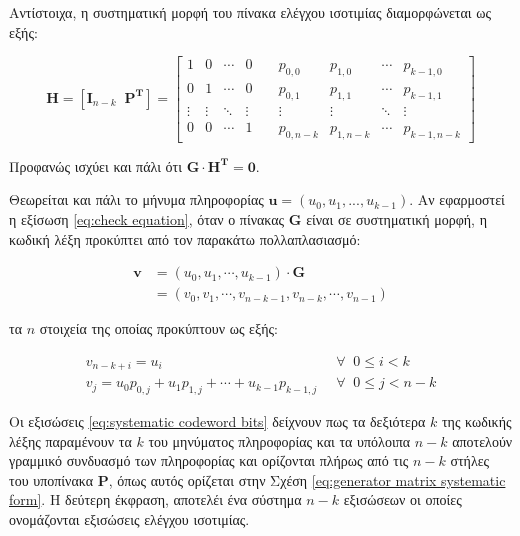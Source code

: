 Αντίστοιχα, η συστηματική μορφή του πίνακα ελέγχου ισοτιμίας διαμορφώνεται ως εξής:

\begin{equation}
\mathbf{H}=\left[\mathbf{I}_{n-k}\;\;\mathbf{P^T}\right]
=\begin{bmatrix}
1 & 0 & \cdots & 0 & \; & p_{0,0} & p_{1,0} & \cdots & p_{k-1,0} \\
0 & 1 & \cdots & 0 & \; & p_{0,1} & p_{1,1} & \cdots & p_{k-1,1} \\
\vdots & \vdots & \ddots & \vdots  & \; & \vdots & \vdots & \ddots & \vdots \\
0 & 0 & \cdots & 1 & \; & p_{0,n-k} & p_{1,n-k} & \cdots & p_{k-1,n-k}
\end{bmatrix}
\label{eq:parity check matrix systematic form}
\end{equation}

\vspace{5mm}
Προφανώς ισχύει και πάλι ότι $\mathbf{G}\cdot\mathbf{H^T}=\mathbf{0}$.

Θεωρείται και πάλι το μήνυμα πληροφορίας $\mathbf{u} = (u_0, u_1, ..., u_{k-1})$. Αν εφαρμοστεί η εξίσωση \ref{eq:check equation}, όταν ο πίνακας $\mathbf{G}$ είναι σε συστηματική μορφή, η κωδική λέξη προκύπτει από τον παρακάτω πολλαπλασιασμό:

\begin{equation}
\begin{split}
\mathbf{v} & = \left( u_0, u_1, \cdots, u_{k-1} \right) \cdot \mathbf{G}\\
& = \left( v_0, v_1, \cdots, v_{n-k-1}, v_{n-k}, \cdots, v_{n-1} \right)
\end{split}
\label{eq:systematic codeword formation}
\end{equation}

\vspace{5mm}

τα $n$ στοιχεία της οποίας προκύπτουν ως εξής:

\begin{equation}
\begin{aligned}
v_{n-k+i}=u_i\;\;\ & \forall\;\;0\leq i < k  \\
v_j=u_0p_{0,j}+u_1p_{1,j}+\cdots+u_{k-1}p_{k-1,j}\;\; & \forall\;\;0\leq j < n-k
\end{aligned}
\label{eq:systematic codeword bits}
\end{equation}

\vspace{5mm}

Οι εξισώσεις \ref{eq:systematic codeword bits} δείχνουν πως τα δεξιότερα $k$  της κωδικής λέξης παραμένουν τα $k$  του μηνύματος πληροφορίας και τα υπόλοιπα $n-k$ αποτελούν γραμμικό συνδυασμό των  πληροφορίας και ορίζονται πλήρως από τις $n-k$ στήλες του υποπίνακα $\mathbf{P}$, όπως αυτός ορίζεται στην Σχέση \ref{eq:generator matrix systematic form}. Η δεύτερη έκφραση, αποτελέι ένα σύστημα $n-k$ εξισώσεων οι οποίες ονομάζονται εξισώσεις ελέγχου ισοτιμίας.

